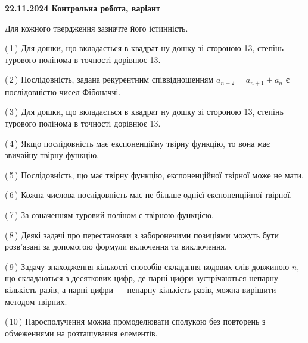 \documentclass[12pt, ukrainian]{article}
\begin{document}
\begin {large}
\begin {large}
\begin {large}
\begin {large}
\begin {large}
\begin {large}
\begin {large}
\begin {large}
\begin {large}
\begin {large}
\begin {large}
{\vspace{5mm}
}
\newpage

\begin {large}

\textbf{22.11.2024 Контрольна робота, варіант  }\par


{
Для кожного твердження зазначте його істинність.\par

\vspace{2mm}

(\,1\,) Для дошки, що вкладається в квадрат ну дошку зі стороною 13, степінь турового полінома в точності дорівнює 13.%



(\,2\,) Послідовність, задана рекурентним співвідношенням $a_{n+2}=a_{n+1}+a_{n}$ є послідовністю чисел Фібоначчі.%



(\,3\,) Для дошки, що вкладається в квадрат ну дошку зі стороною 13, степінь турового полінома в точності дорівнює 13.%



(\,4\,) Якщо послідовність має експоненційну твірну функцію, то вона має звичайну твірну функцію.%



(\,5\,) Послідовність, що має твірну функцію, експоненційної твірної може не мати.%



(\,6\,) Кожна числова послідовність має не більше однієї  експоненційної твірної.%



(\,7\,) За означенням туровий поліном є твірною функцією.%



(\,8\,) Деякі задачі про перестановки з забороненими позиціями можуть бути розв’я\-за\-ні за допомогою формули включення та виключення.%



(\,9\,) Задачу знаходження кількості способів складання кодових слів довжиною $n$, що складаються з десяткових цифр, де парні цифри зустрічаються непарну кількість разів, а парні цифри — непарну кількість разів, можна вирішити методом твірних.%



(\,10\,) Паросполучення можна промоделювати сполукою без повторень з обмеженнями на розташування елементів.%




}
\end{large}
\end{large}
\end{large}
\end{large}
\end{large}
\end{large}
\end{large}
\end{large}
\end{large}
\end{large}
\end{large}
\end{large}
\end{document}
